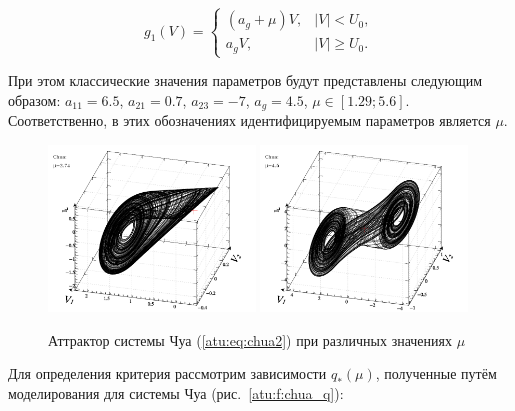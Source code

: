 \documentclass[a4paper,12pt]{article}
\begin{document}
\begin{equation}
g_1(V) =
\begin{cases}
  ( a_g + \mu ) V , & |V| <   U_0, \\
  a_g V           , & |V| \ge U_0.
\end{cases}
\label{atu:eq:diodchua2}
\end{equation}

При этом классические значения параметров будут представлены следующим образом:
$ a_{11} = 6.5 $, $a_{21} = 0.7$, $ a_{23} = -7 $, $ a_g = 4.5 $,
$ \mu \in [ 1.29 ; 5.6 ] $.
Соответственно, в этих обозначениях
идентифицируемым параметров является $\mu$.



\begin{figure}[htb!]
\centerline{
  \includegraphics[width=0.49\textwidth]{p/cha/chua/chua_1-p_xyz_mu=2x74.png}
  \includegraphics[width=0.49\textwidth]{p/cha/chua/chua_1-p_xyz_mu=4x50.png}
}
\caption{Аттрактор системы Чуа (\ref{atu:eq:chua2}) при различных значениях $\mu$}
\label{atu:f:chua_phase}
\end{figure}


Для определения критерия рассмотрим зависимости
$q_{*}(\mu) $, полученные путём моделирования
для системы Чуа (рис.~\ref{atu:f:chua_q}):
\end{document}
